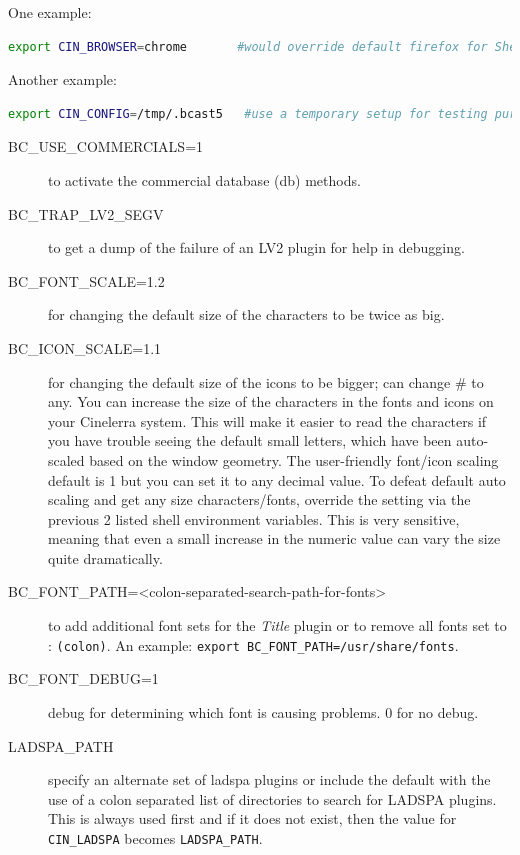 One example:

\begin{lstlisting}[language=bash]
export CIN_BROWSER=chrome       #would override default firefox for Shell Cmds.
\end{lstlisting}

Another example:

\begin{lstlisting}[language=bash]
export CIN_CONFIG=/tmp/.bcast5   #use a temporary setup for testing purposes.
\end{lstlisting}

\begin{description}
    \item[{\small BC\_USE\_COMMERCIALS=1}] to activate the commercial database (db) methods.
    \item[{\small BC\_TRAP\_LV2\_SEGV}] to get a dump of the failure of an LV2 plugin for help in debugging.
    \item[{\small BC\_FONT\_SCALE=1.2}] for changing the default size of the characters to be twice as big.
    \item[{\small BC\_ICON\_SCALE=1.1}] for changing the default size of the icons to be bigger; can change \# to any. You can increase the size of the characters in the fonts and icons on your Cinelerra system.  This will make it easier to read the characters if you have trouble seeing the default small letters, which have been auto-scaled based on the window geometry. The user-friendly font/icon scaling default is 1 but you can set it to any decimal value.  To defeat default auto scaling and get any size characters/fonts, override the setting via the previous 2 listed shell environment variables. This is very sensitive, meaning that even a small increase in the numeric value can vary the size quite dramatically.
    \item[{\small BC\_FONT\_PATH=<colon-separated-search-path-for-fonts>}]  to add additional font sets for the \textit{Title}
    plugin or to remove all fonts set to : \texttt{(colon)}.  An example: \texttt{export BC\_FONT\_PATH=/usr/share/fonts}.
    \item[{\small BC\_FONT\_DEBUG=1}] debug for determining which font is causing problems.  0 for no debug.
    \item[{\small LADSPA\_PATH}] specify an alternate set of ladspa plugins or include the default with the use of a colon separated list of directories to search for LADSPA plugins. This is always used first and if it does not
    exist, then the value for \texttt{CIN\_LADSPA} becomes \texttt{LADSPA\_PATH}.

\end{description}
